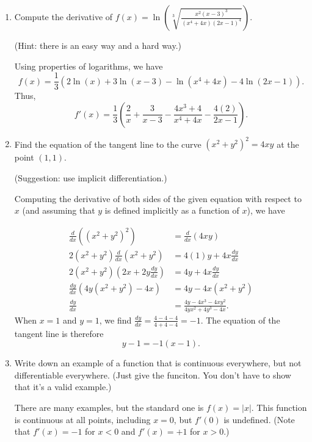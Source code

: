 \documentclass[12pt]{article}
\newcommand{\points}[1]{\marginpar{\hspace{24pt}[#1]}}
\newcommand{\di}{\displaystyle}
\newcommand{\abs}[1]{\lvert #1\rvert}
\begin{document}
\begin{enumerate}
\begin{enumerate}
\end{enumerate}
\newpage

\item Compute the derivative of $\di f(x)=\ln\left(\sqrt[3]{\frac{x^2(x-3)^3}{(x^4+4x)(2x-1)^4}}\right)$. \points{3}

(Hint: there is an easy way and a hard way.)

\bigskip

Using properties of logarithms, we have
\[
 f(x) = \frac{1}{3}\left(2\ln(x)+3\ln(x-3)-\ln(x^4+4x)-4\ln(2x-1)\right).
\]
Thus, 
\[
 f'(x) = \frac{1}{3}\left(\frac{2}{x}+\frac{3}{x-3}-\frac{4x^3+4}{x^4+4x}-\frac{4(2)}{2x-1}\right).
\]

\bigskip

\item Find the equation of the tangent line to the curve $(x^2+y^2)^2=4xy$ at the point $(1,1)$. \points{3}

(Suggestion: use implicit differentiation.)

\bigskip

Computing the derivative of both sides of the given equation with respect to $x$ (and assuming that $y$ is defined implicitly as a function of $x$), we have

\begin{align*}
 \frac{d}{dx}((x^2+y^2)^2) & = \frac{d}{dx} (4xy)\\
 2(x^2+y^2)\frac{d}{dx}(x^2+y^2) & = 4(1)y + 4x\frac{dy}{dx}\\
 2(x^2+y^2)\left(2x+2y\frac{dy}{dx}\right) & = 4y + 4x\frac{dy}{dx}\\
 \frac{dy}{dx}(4y(x^2+y^2)-4x) & = 4y-4x(x^2+y^2)\\
 \frac{dy}{dx} & = \frac{4y-4x^3-4xy^2}{4yx^2+4y^3-4x}.
\end{align*}
When $x=1$ and $y=1$, we find $\frac{dy}{dx} = \frac{4-4-4}{4+4-4} = -1$. The equation of the tangent line is therefore
\[
 y-1 = -1(x-1).
\]




\item Write down an example of a function that is continuous everywhere, \points{1} but not differentiable everywhere. (Just give the funciton. You don't have to show that it's a valid example.)

\medskip

There are many examples, but the standard one is $f(x)=\abs{x}$. This function is continuous at all points, including $x=0$, but $f'(0)$ is undefined. (Note that $f'(x)=-1$ for $x<0$ and $f'(x)=+1$ for $x>0$.)
\end{enumerate}
\end{document}

